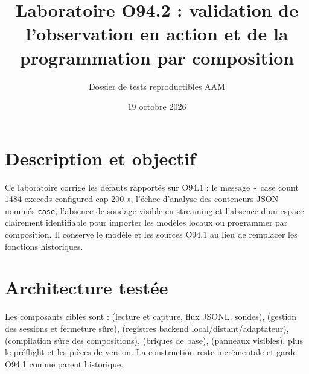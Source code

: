 \documentclass[11pt,a4paper]{article}
\title{Laboratoire O94.2 : validation de l'observation en action et de la programmation par composition}
\author{Dossier de tests reproductibles AAM}
\date{19 octobre 2026}
\begin{document}
\maketitle
\tableofcontents
\section{Description et objectif}
Ce laboratoire corrige les défauts rapportés sur O94.1 : le message « case count 1484 exceeds configured cap 200 », l'échec d'analyse des conteneurs JSON nommés \verb|case|, l'absence de sondage visible en streaming et l'absence d'un espace clairement identifiable pour importer les modèles locaux ou programmer par composition. Il conserve le modèle et les sources O94.1 au lieu de remplacer les fonctions historiques.

\section{Architecture testée}
Les composants ciblés sont :  (lecture et capture, flux JSONL, sondes),  (gestion des sessions et fermeture sûre),  (registres backend local/distant/adaptateur),  (compilation sûre des compositions),  (briques de base),  (panneaux visibles), plus le préflight et les pièces de version. La construction reste incrémentale et garde O94.1 comme parent historique.
\end{document}
